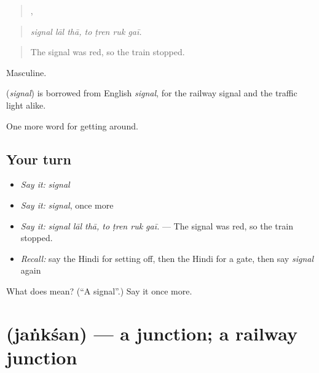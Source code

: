 \begin{quote}
  ,    
\end{quote}

\begin{quote}
\emph{signal lāl thā, to ṭren ruk gaī.}
\end{quote}

\begin{quote}
The signal was red, so the train stopped.
\end{quote}

Masculine.

\begin{cousinweb}
\textbf{} (\emph{signal}) is borrowed from English \emph{signal}, for the railway signal and the traffic light alike.
\end{cousinweb}

\begin{grammarlens}[title={What you've built}]
One more word for getting around.
\end{grammarlens}

\subsection*{Your turn}
\begin{itemize}
\raggedright
  \item \emph{Say it:} \emph{signal}
  \item \emph{Say it:} \emph{signal}, once more
  \item \emph{Say it:} \emph{signal lāl thā, to ṭren ruk gaī.} — The signal was red, so the train stopped.
  \item \emph{Recall:} say the Hindi for setting off, then the Hindi for a gate, then say \emph{signal} again
\end{itemize}

\begin{tcolorbox}[breakable,colback=teal!4,colframe=teal!35!black,title={Before you move on}]
What does  mean? (\textquotedblleft{}A signal\textquotedblright{}.) Say it once more.
\end{tcolorbox}
\section[\texorpdfstring{\hi{जंक्शन} (jaṅkśan)}{जंक्शन (jaṅkśan)}]{ (jaṅkśan) — a junction; a railway junction}

\label{lesson:HI-C401-janksan}



